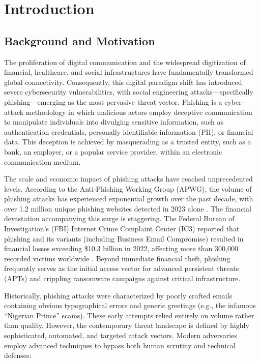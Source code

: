 \chapter{Introduction}
\label{introduction}

\section{Background and Motivation}\label{background-and-motivation}

The proliferation of digital communication and the widespread
digitization of financial, healthcare, and social infrastructures have
fundamentally transformed global connectivity. Consequently, this
digital paradigm shift has introduced severe cybersecurity
vulnerabilities, with social engineering attacks---specifically
phishing---emerging as the most pervasive threat vector. Phishing is a
cyber-attack methodology in which malicious actors employ deceptive
communication to manipulate individuals into divulging sensitive
information, such as authentication credentials, personally identifiable
information (PII), or financial data. This deception is achieved by
masquerading as a trusted entity, such as a bank, an employer, or a
popular service provider, within an electronic communication medium.

The scale and economic impact of phishing attacks have reached
unprecedented levels. According to the Anti-Phishing Working Group
(APWG), the volume of phishing attacks has experienced exponential
growth over the past decade, with over 1.2 million unique phishing
websites detected in 2023 alone \cite{apwg2023}. The financial devastation
accompanying this surge is staggering. The Federal Bureau of
Investigation's (FBI) Internet Crime Complaint Center (IC3) reported
that phishing and its variants (including Business Email Compromise)
resulted in financial losses exceeding \$10.3 billion in 2022, affecting
more than 300,000 recorded victims worldwide \cite{fbi2022}. Beyond immediate
financial theft, phishing frequently serves as the initial access vector
for advanced persistent threats (APTs) and crippling ransomware
campaigns against critical infrastructure.

Historically, phishing attacks were characterized by poorly crafted
emails containing obvious typographical errors and generic greetings
(e.g., the infamous ``Nigerian Prince'' scams). These early attempts
relied entirely on volume rather than quality. However, the contemporary
threat landscape is defined by highly sophisticated, automated, and
targeted attack vectors. Modern adversaries employ advanced techniques
to bypass both human scrutiny and technical defenses:

